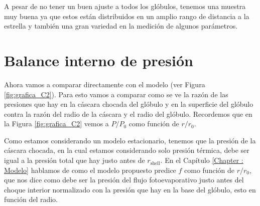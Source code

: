 \documentclass{book}
\begin{document}
A pesar de no tener un buen ajuste a todos los glóbulos, tenemos una
muestra muy buena ya que estos están distribuidos en un amplio rango
de distancia a la estrella y también una gran variedad en la medición
de algunos parámetros.



\section{Balance interno de presión}\label{Sec : comparacion-modelo}

Ahora vamos a comparar directamente con el modelo (ver Figura
\ref{fig:grafica_C2}). Para esto vamos a comparar como se ve la razón
de las presiones que hay en la cáscara chocada del glóbulo y en la
superficie del glóbulo contra la razón del radio de la cáscara y el
radio del glóbulo. Recordemos que en la Figura \ref{fig:grafica_C2}
vemos a $P/P_0$ como función de $r/r_0$.

Como estamos considerando un modelo estacionario, tenemos que la
presión de la cáscara chocada, en la cual estamos considerando solo
presión térmica, debe ser igual a la presión total que hay justo antes
de $r_\mathrm{shell}$. En el Capítulo \ref{Chapter : Modelo} hablamos
de como el modelo propuesto predice $f$ como función de $r/r_0$, que
nos dice como debe ser la presión del flujo fotoevaporativo justo
antes del choque interior normalizado con la presión que hay en la
base del glóbulo, esto en función del radio.
\end{document}
